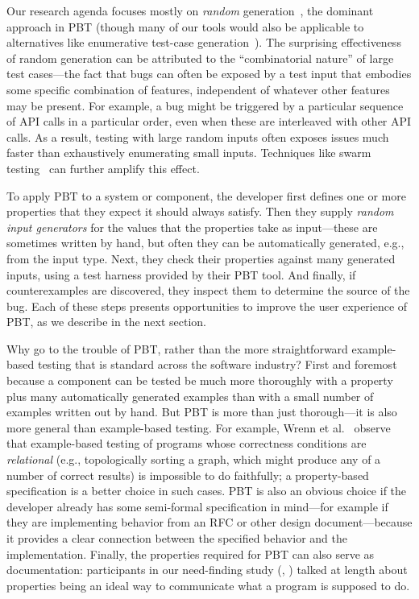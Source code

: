 Our research agenda focuses mostly on {\em random}
generation~\cite{hamlet1994random}, the dominant approach in PBT
(though many of our tools would also be applicable to alternatives
like enumerative test-case
generation~\cite{DBLP:conf/haskell/RuncimanNL08, leancheck}).  The
surprising effectiveness of random generation can be attributed to the
``combinatorial nature'' of large test cases---the fact that bugs can
often be exposed by a test input that embodies some specific combination
of features, independent of whatever other features may be
present.  For example, a bug might be triggered by a particular
sequence of API calls in a particular order, even when
these are interleaved with other API calls. As a result, testing with
large random inputs often exposes issues much faster than exhaustively
enumerating small inputs.  Techniques like swarm
testing~\cite{groce2012swarm} can further amplify this effect.

To apply PBT to a system or component, the developer first defines one
or more properties that they expect it should always satisfy. Then
they supply {\em random input generators} for the values that the
properties take as input---these are sometimes written by hand, but
often they can be automatically generated, e.g., from the input
type. Next, they check their properties against many generated inputs,
using a test harness provided by their PBT tool. And finally, if
counterexamples are discovered, they inspect them to determine the
source of the bug.  Each of these steps presents opportunities\iflater{}\fi{} to
improve the user experience of PBT, as we describe in the next
section.

\smallskip

Why go to the trouble of PBT, rather than the more straightforward
example-based testing that is standard across the software industry?
First and foremost because a component can be tested be much more
thoroughly with a property plus many automatically generated examples
than with a small number of examples written out by hand.
But
PBT is more than just thorough---it is also more general than example-based
testing. For example, Wrenn et al.~\cite{wrenn2021using} observe that example-based testing
of programs whose correctness conditions are {\em relational} (e.g.,
topologically sorting a graph, which might
produce any of a number of correct results) is impossible to do
faithfully; a property-based specification is a better choice in
such cases.
PBT is also
an obvious choice if
the developer already has some semi-formal
specification in mind---for example if they are implementing behavior from an RFC or
other design document---because it provides a clear connection between the
specified behavior and the implementation.
Finally, the
properties required for PBT can also serve as documentation:
participants in our need-finding study (, )
talked at length about properties being an ideal way to communicate what a
program is supposed to do.

